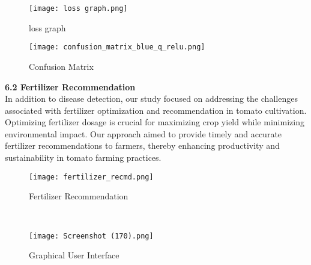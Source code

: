 \documentclass[12pt, English]{article}
\begin{document}
\begin{normalsize}
\newpage

\begin{figure}[htb]
\begin{center}
\texttt{[image: loss graph.png]}
\end{center}
\begin{center}
\renewcommand{\thefigure}{6.1.3}
\caption{\footnotesize loss graph }
\end{center}
\end{figure}

\newpage
\begin{figure}[htb]
\begin{center}
\texttt{[image: confusion\_matrix\_blue\_q\_relu.png]}
\end{center}
\begin{center}
\renewcommand{\thefigure}{6.1.4}
\caption{\footnotesize Confusion Matrix}
\end{center}
\end{figure}

\newpage
\textbf{6.2 Fertilizer Recommendation}\\
In addition to disease detection, our study focused on addressing the challenges associated with fertilizer optimization and recommendation in tomato cultivation. Optimizing fertilizer dosage is crucial for maximizing crop yield while minimizing environmental impact. Our approach aimed to provide timely and accurate fertilizer recommendations to farmers, thereby enhancing productivity and sustainability in tomato farming practices.

\newpage
\begin{figure}[htb]
\begin{center}
\texttt{[image: fertilizer\_recmd.png]}
\end{center}
\begin{center}
\renewcommand{\thefigure}{6.2.1}
\caption{\footnotesize Fertilizer Recommendation }
\end{center}
\end{figure}\\

\newpage
\begin{figure}[htb]
\begin{center}
\texttt{[image: Screenshot (170).png]}
\end{center}
\begin{center}
\renewcommand{\thefigure}{6.2.2}
\caption{\footnotesize Graphical User Interface }
\end{center}
\end{figure}\\



\end{normalsize}
\end{document}
